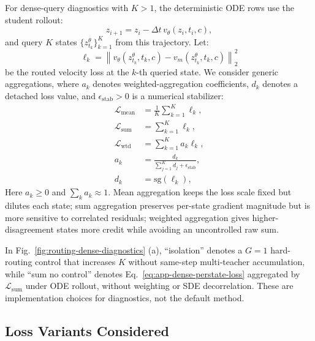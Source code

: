 For dense-query diagnostics with $K>1$, the deterministic ODE rows use the student rollout:
\begin{equation}
  z_{i+1}=z_i-\Delta t\,v_\theta(z_i,t_i,c),
  \label{eq:app-dense-ode-rollout}
\end{equation}
and query $K$ states $\{z_{t_k}^\theta\}_{k=1}^{K}$ from this trajectory. Let:
\begin{equation}
  \ell_k=\left\|v_\theta(z_{t_k}^\theta,t_k,c)-v_m(z_{t_k}^\theta,t_k,c)\right\|_2^2
  \label{eq:app-dense-perstate-loss}
\end{equation}
be the routed velocity loss at the $k$-th queried state. We consider generic aggregations, where $a_k$ denotes weighted-aggregation coefficients, $d_k$ denotes a detached loss value, and $\epsilon_{\mathrm{stab}}>0$ is a numerical stabilizer:
\begin{align}
  \mathcal{L}_{\mathrm{mean}} &= \frac{1}{K}\sum_{k=1}^{K}\ell_k,\\
  \mathcal{L}_{\mathrm{sum}}  &= \sum_{k=1}^{K}\ell_k,\\
  \mathcal{L}_{\mathrm{wtd}}  &= \sum_{k=1}^{K}a_k\ell_k,\\
  a_k &=\frac{d_k}{\sum_{j=1}^{K}d_j+\epsilon_{\mathrm{stab}}},\\
  d_k &=\mathrm{sg}(\ell_k),
  \label{eq:app-dense-weighted}
\end{align}
Here $a_k\ge0$ and $\sum_k a_k\approx1$. Mean aggregation keeps the loss scale fixed but dilutes each state; sum aggregation preserves per-state gradient magnitude but is more sensitive to correlated residuals; weighted aggregation gives higher-disagreement states more credit while avoiding an uncontrolled raw sum. 

In Fig.~\ref{fig:routing-dense-diagnostics} (a), ``isolation'' denotes a $G{=}1$ hard-routing control that increases $K$ without same-step multi-teacher accumulation, while ``sum no control'' denotes Eq.~\eqref{eq:app-dense-perstate-loss} aggregated by $\mathcal{L}_{\mathrm{sum}}$ under ODE rollout, without weighting or SDE decorrelation. These are implementation choices for diagnostics, not the default method.


\vspace{0.2cm}


\subsection{Loss Variants Considered}
\label{app:loss-variants}

